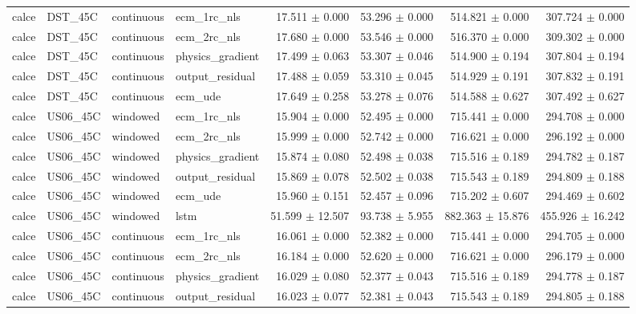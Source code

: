 \begin{longtable}{llllrrrr}
calce & DST\_45C & continuous & ecm\_1rc\_nls & 17.511 $\pm$ 0.000 & 53.296 $\pm$ 0.000 & 514.821 $\pm$ 0.000 & 307.724 $\pm$ 0.000 \\
calce & DST\_45C & continuous & ecm\_2rc\_nls & 17.680 $\pm$ 0.000 & 53.546 $\pm$ 0.000 & 516.370 $\pm$ 0.000 & 309.302 $\pm$ 0.000 \\
calce & DST\_45C & continuous & physics\_gradient & 17.499 $\pm$ 0.063 & 53.307 $\pm$ 0.046 & 514.900 $\pm$ 0.194 & 307.804 $\pm$ 0.194 \\
calce & DST\_45C & continuous & output\_residual & 17.488 $\pm$ 0.059 & 53.310 $\pm$ 0.045 & 514.929 $\pm$ 0.191 & 307.832 $\pm$ 0.191 \\
calce & DST\_45C & continuous & ecm\_ude & 17.649 $\pm$ 0.258 & 53.278 $\pm$ 0.076 & 514.588 $\pm$ 0.627 & 307.492 $\pm$ 0.627 \\
calce & US06\_45C & windowed & ecm\_1rc\_nls & 15.904 $\pm$ 0.000 & 52.495 $\pm$ 0.000 & 715.441 $\pm$ 0.000 & 294.708 $\pm$ 0.000 \\
calce & US06\_45C & windowed & ecm\_2rc\_nls & 15.999 $\pm$ 0.000 & 52.742 $\pm$ 0.000 & 716.621 $\pm$ 0.000 & 296.192 $\pm$ 0.000 \\
calce & US06\_45C & windowed & physics\_gradient & 15.874 $\pm$ 0.080 & 52.498 $\pm$ 0.038 & 715.516 $\pm$ 0.189 & 294.782 $\pm$ 0.187 \\
calce & US06\_45C & windowed & output\_residual & 15.869 $\pm$ 0.078 & 52.502 $\pm$ 0.038 & 715.543 $\pm$ 0.189 & 294.809 $\pm$ 0.188 \\
calce & US06\_45C & windowed & ecm\_ude & 15.960 $\pm$ 0.151 & 52.457 $\pm$ 0.096 & 715.202 $\pm$ 0.607 & 294.469 $\pm$ 0.602 \\
calce & US06\_45C & windowed & lstm & 51.599 $\pm$ 12.507 & 93.738 $\pm$ 5.955 & 882.363 $\pm$ 15.876 & 455.926 $\pm$ 16.242 \\
calce & US06\_45C & continuous & ecm\_1rc\_nls & 16.061 $\pm$ 0.000 & 52.382 $\pm$ 0.000 & 715.441 $\pm$ 0.000 & 294.705 $\pm$ 0.000 \\
calce & US06\_45C & continuous & ecm\_2rc\_nls & 16.184 $\pm$ 0.000 & 52.620 $\pm$ 0.000 & 716.621 $\pm$ 0.000 & 296.179 $\pm$ 0.000 \\
calce & US06\_45C & continuous & physics\_gradient & 16.029 $\pm$ 0.080 & 52.377 $\pm$ 0.043 & 715.516 $\pm$ 0.189 & 294.778 $\pm$ 0.187 \\
calce & US06\_45C & continuous & output\_residual & 16.023 $\pm$ 0.077 & 52.381 $\pm$ 0.043 & 715.543 $\pm$ 0.189 & 294.805 $\pm$ 0.188 \\

\end{longtable}
